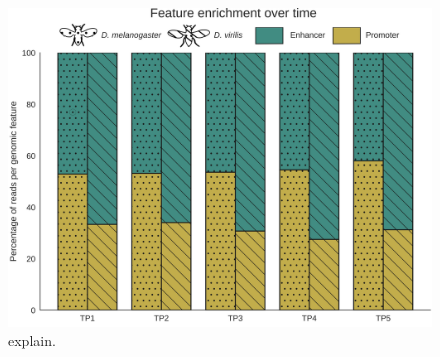 \begin{figure}[H]
    \includegraphics[width=\linewidth]{ch4.hourglass/images/feature_enrichment.png}
    \caption{explain.}
    \label{fig:peak_enrichment}
\end{figure}

\closesupplement
